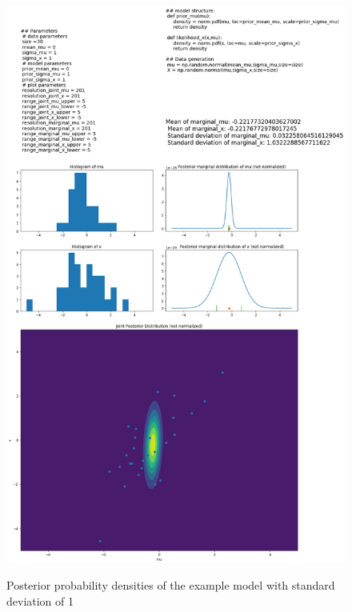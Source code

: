 \documentclass{article}
\begin{document}
\begin{figure}
	\includegraphics[width=\textwidth]{images/ground_truth_posterior_3.png}
	\label{fig:ground_truth_posterior_3}
	\caption[Posterior probability densities of the example model with standard deviation of 1]{Posterior probability densities of the example model with standard deviation of 1}
\end{figure}
\end{document}
